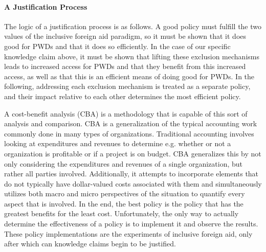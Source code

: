 \documentclass[a4paper]{article}
\begin{document}
\paragraph{A Justification Process}

The logic of a justification process is as follows. A good policy must fulfill
the two values of the inclusive foreign aid paradigm, so it must be shown that
it does good for PWDs and that it does so efficiently. In the case of our
specific knowledge claim above, it must be shown that lifting these exclusion
mechanisms leads to increased access for PWDs and that they benefit from this
increased access, as well as that this is an efficient means of doing good for
PWDs. In the following, addressing each exclusion mechanism is treated as a
separate policy, and their impact relative to each other determines the most
efficient policy. 

A cost-benefit analysis (CBA) is a methodology that is capable of this sort of
analysis and comparison. CBA is a generalization of the typical accounting
work commonly done in many types of organizations. Traditional accounting
involves looking at expenditures and revenues to determine e.g. whether or not
a organization is profitable or if a project is on budget. CBA generalizes
this by not only considering the expenditures and revenues of a single
organization, but rather all parties involved. Additionally, it attempts to
incorporate elements that do not typically have dollar-valued costs associated
with them \citep{mishan2015elements} and simultaneously utilizes both macro
and micro perspectives of the situation to quantify every aspect that is
involved. In the end, the best policy is the policy that has the greatest
benefits for the least cost. Unfortunately, the only way to actually determine
the effectiveness of a policy is to implement it and observe the results.
These policy implementations are the experiments of inclusive foreign aid,
only after which can knowledge claims begin to be justified. 
\end{document}
